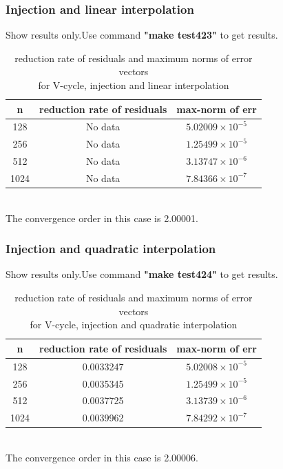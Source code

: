 \documentclass[a4paper,twocolumn]{article}
\theoremstyle{definition}
\begin{document}
\subsubsection{Injection and linear interpolation}
Show results only.Use command \textbf{"make test423"} to get results. \\
\begin{table}[!htp]
	\centering
	\begin{tabular}{|c|c|c|}
		\hline	
		n &reduction rate of residuals & max-norm of err \\
		\hline		
		128 &No data& $5.02009\times 10^{-5}$ \\
		\hline		
		256 &No data& $1.25499\times 10^{-5}$ \\
		\hline		
		512 &No data& $3.13747\times 10^{-6}$ \\
		\hline		
		1024 &No data& $7.84366\times 10^{-7}$ \\
		\hline
	\end{tabular}
	\caption{reduction rate of residuals and maximum norms of error vectors \\for V-cycle, injection and linear interpolation}
\end{table}\\
\newpage
\noindent The convergence order in this case is 2.00001.
\subsubsection{Injection and quadratic interpolation}
Show results only.Use command \textbf{"make test424"} to get results. \\
\begin{table}[!htp]
	\centering
	\begin{tabular}{|c|c|c|}
		\hline	
		n &reduction rate of residuals & max-norm of err \\
		\hline		
		128 &0.0033247& $5.02008\times 10^{-5}$ \\
		\hline		
		256 &0.0035345& $1.25499\times 10^{-5}$ \\
		\hline		
		512 &0.0037725& $3.13739\times 10^{-6}$ \\
		\hline		
		1024 &0.0039962& $7.84292\times 10^{-7}$ \\
		\hline
	\end{tabular}
	\caption{reduction rate of residuals and maximum norms of error vectors \\for V-cycle, injection and quadratic interpolation}
\end{table}\\
The convergence order in this case is 2.00006.
\end{document}
